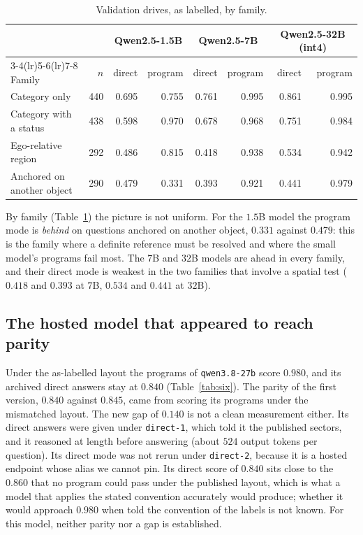 \documentclass[11pt,a4paper]{article}
\newcommand{\code}[1]{\texttt{\small #1}}
\begin{document}
\begin{table}[ht]
\centering
\small
\begin{tabular}{lrrrrrrr}
\toprule
 & & \multicolumn{2}{c}{Qwen2.5-1.5B} & \multicolumn{2}{c}{Qwen2.5-7B} & \multicolumn{2}{c}{Qwen2.5-32B (int4)} \\
\cmidrule(lr){3-4}\cmidrule(lr){5-6}\cmidrule(lr){7-8}
Family & $n$ & direct & program & direct & program & direct & program \\
\midrule
Category only               & 440 & 0.695 & 0.755 & 0.761 & 0.995 & 0.861 & 0.995 \\
Category with a status      & 438 & 0.598 & 0.970 & 0.678 & 0.968 & 0.751 & 0.984 \\
Ego-relative region         & 292 & 0.486 & 0.815 & 0.418 & 0.938 & 0.534 & 0.942 \\
Anchored on another object  & 290 & 0.479 & 0.331 & 0.393 & 0.921 & 0.441 & 0.979 \\
\bottomrule
\end{tabular}
\caption{Validation drives, as labelled, by family.}
\label{tab:valfamily}
\end{table}

By family (Table~\ref{tab:valfamily}) the picture is not uniform. For the
$1.5$B model the program mode is \emph{behind} on questions anchored on
another object, $0.331$ against $0.479$: this is the family where a definite
reference must be resolved and where the small model's programs fail most.
The $7$B and $32$B models are ahead in every family, and their direct mode
is weakest in the two families that involve a spatial test ($0.418$ and
$0.393$ at $7$B, $0.534$ and $0.441$ at $32$B).

\subsection{The hosted model that appeared to reach parity}
\label{sec:hosted}

Under the as-labelled layout the programs of \code{qwen3.8-27b} score
$0.980$, and its archived direct answers stay at $0.840$
(Table~\ref{tab:six}). The parity of the first version, $0.840$ against
$0.845$, came from scoring its programs under the mismatched layout. The new
gap of $0.140$ is not a clean measurement either. Its direct answers were
given under \code{direct-1}, which told it the published sectors, and it
reasoned at length before answering (about $524$ output tokens per
question). Its direct mode was not rerun under \code{direct-2}, because it is
a hosted endpoint whose alias we cannot pin. Its direct score of $0.840$ sits
close to the $0.860$ that no program could pass under the published layout,
which is what a model that applies the stated convention accurately would
produce; whether it would approach $0.980$ when told the convention of the
labels is not known. For this model, neither parity nor a gap is established.
\end{document}
